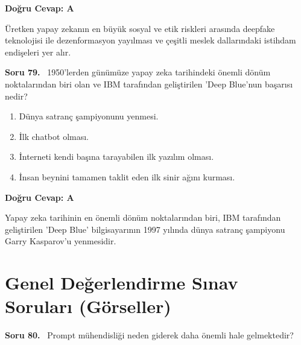 \documentclass[11pt,a4paper,openany]{book}
\begin{document}
\vspace{4pt}
\begin{tcolorbox}[title=Cevap ve Açıklama, colback=gray!3!white, colframe=primarycolor!90!black, arc=2mm, fonttitle=\bfseries\sffamily, top=6pt, bottom=6pt]
    \textbf{Doğru Cevap: A}

    \vspace{2pt}
    Üretken yapay zekanın en büyük sosyal ve etik riskleri arasında deepfake teknolojisi ile dezenformasyon yayılması ve çeşitli meslek dallarındaki istihdam endişeleri yer alır.
\end{tcolorbox}
\vspace{10pt}
\needspace{5cm}
\vspace{8pt}
\noindent\textbf{\large\sffamily Soru 79.} \ 1950'lerden günümüze yapay zeka tarihindeki önemli dönüm noktalarından biri olan ve IBM tarafından geliştirilen 'Deep Blue'nun başarısı nedir?

\begin{enumerate}[label=\Alph*), leftmargin=25pt, topsep=4pt, itemsep=2pt]
        \item Dünya satranç şampiyonunu yenmesi.
        \item İlk chatbot olması.
        \item İnterneti kendi başına tarayabilen ilk yazılım olması.
        \item İnsan beynini tamamen taklit eden ilk sinir ağını kurması.
\end{enumerate}

\vspace{4pt}
\begin{tcolorbox}[title=Cevap ve Açıklama, colback=gray!3!white, colframe=primarycolor!90!black, arc=2mm, fonttitle=\bfseries\sffamily, top=6pt, bottom=6pt]
    \textbf{Doğru Cevap: A}

    \vspace{2pt}
    Yapay zeka tarihinin en önemli dönüm noktalarından biri, IBM tarafından geliştirilen 'Deep Blue' bilgisayarının 1997 yılında dünya satranç şampiyonu Garry Kasparov'u yenmesidir.
\end{tcolorbox}
\vspace{10pt}

\chapter{Genel Değerlendirme Sınav Soruları (Görseller)}
\needspace{5cm}
\vspace{8pt}
\noindent\textbf{\large\sffamily Soru 80.} \ Prompt mühendisliği neden giderek daha önemli hale gelmektedir?
\end{document}

